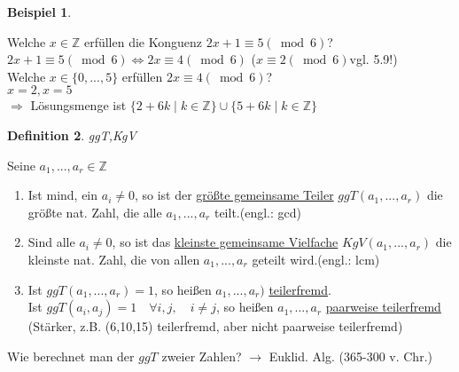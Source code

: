 \documentclass[a4paper,11pt]{article}
\newtheorem{definition}{Definition}[section]
\newtheorem{bsp}[definition]{Beispiel}
\newcommand{\hsp}{\hspace{5mm}}
\begin{document}
\begin{bsp}
\end{bsp}
Welche $x\in\mathbb{Z}$ erfüllen die Konguenz $2x+1\equiv5(\bmod 6)$? \\
$2x+1\equiv5(\bmod 6)\Leftrightarrow 2x\equiv4(\bmod6)$ \hsp (\xcancel{$\Leftrightarrow$}$x\equiv2(\bmod6)$\hsp vgl. 5.9!) \\
Welche $x\in\{0,...,5\}$ erfüllen $2x\equiv4(\bmod6)$? \\
$x=2,x=5$ \\
$\Rightarrow$ Lösungsmenge ist $\{2+6k\mid k\in\mathbb{Z}\}\cup\{5+6k\mid k\in\mathbb{Z}\}$

\begin{definition}
	ggT,KgV
\end{definition}
Seine $a_1,...,a_r\in\mathbb{Z}$
\begin{enumerate}[label=\alph*)]
	\item Ist mind, ein $a_i\neq0$, so ist der \underline{größte gemeinsame Teiler} $ggT(a_1,...,a_r)$ die größte nat. Zahl, die alle $a_1,...,a_r$ teilt.\hsp (engl.: gcd)
	\item Sind alle $a_i\neq0$, so ist das \underline{kleinste gemeinsame Vielfache} $KgV(a_1,...,a_r)$ die kleinste nat. Zahl, die von allen $a_1,...,a_r$ geteilt wird.\hsp (engl.: lcm)
	\item Ist $ggT(a_1,...,a_r)=1$, so heißen $a_1,...,a_r)$ \underline{teilerfremd}. \\
	Ist $ggT(a_i,a_j)=1\quad\forall i,j,\quad i\neq j$, so heißen $a_1,...,a_r$ \underline{paarweise teilerfremd} \\
	(Stärker, z.B. (6,10,15) teilerfremd, aber nicht paarweise teilerfremd)
\end{enumerate}
Wie berechnet man der $ggT$ zweier Zahlen? $\rightarrow$ Euklid. Alg. (365-300 v. Chr.)

\newpage
\end{document}
